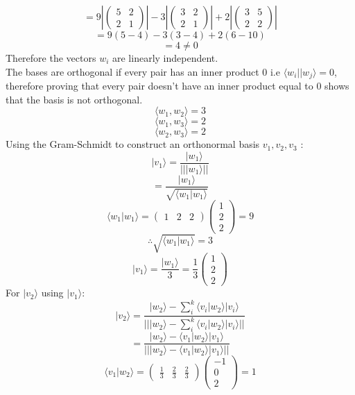 \documentclass[12pt]{article}
\newcommand{\ket}[1]{\vert{#1}\rangle}
\newcommand{\bra}[1]{\langle{#1}\vert}
\begin{document}
\begin{enumerate}
$$ = 9 |\left( \begin{array}{cc} 5 & 2 \\ 2 & 1 \end{array} \right) | - 3|\left( \begin{array}{cc} 3 & 2 \\ 2 & 1 \end{array} \right) | + 2|\left( \begin{array}{cc} 3 & 5 \\ 2 & 2 \end{array} \right) | $$
$$ = 9(5-4) -3(3-4)+2(6-10) $$
$$ = 4 \neq 0 $$
Therefore the vectors $w_i$ are linearly independent. 
\\
The bases are orthogonal if every pair has an inner product 0 i.e $\bra{w_i}\ket{w_j} = 0$, therefore proving that every pair doesn't have an inner product equal to 0 shows that the basis is not orthogonal.
$$ \langle w_1,w_2 \rangle = 3$$
$$ \langle w_1,w_3 \rangle = 2$$
$$ \langle w_2,w_3 \rangle = 2$$
Using the Gram-Schmidt to construct an orthonormal basis $v_1, v_2, v_3$ :
$$ \ket{v_1} = \frac{\ket{w_1}}{||\ket{w_1}||} $$
$$ = \frac{\ket{w_1}}{\sqrt{\langle w_1 | w_1 \rangle}} $$
$$ \langle w_1 | w_1 \rangle = \left( \begin{array}{ccc} 1 & 2 &2 \end{array} \right) \left( \begin{array}{ccc} 1 \\ 2 \\ 2\end{array} \right) = 9 $$
$$ \therefore \sqrt{\langle w_1 | w_1 \rangle} = 3 $$
$$ \ket{v_1} = \frac{\ket{w_1}}{3} = \frac{1}{3} \left( \begin{array}{ccc} 1 \\ 2 \\ 2\end{array} \right) $$
For $\ket{v_2} $ using $\ket{v_1}$: 
$$ \ket{v_2} = \frac{\ket{w_2} - \sum_i^k \langle v_i | w_2 \rangle \ket{v_i}}{||\ket{w_2} - \sum_i^k \langle v_i | w_2 \rangle \ket{v_i} ||} $$
$$ = \frac{\ket{w_2} - \langle v_1 | w_2 \rangle \ket{v_1}}{||\ket{w_2} - \langle v_1 | w_2 \rangle \ket{v_1} ||}$$
$$ \langle v_1 | w_2 \rangle = \left( \begin{array}{ccc} \frac{1}{3} & \frac{2}{3} &\frac{2}{3} \end{array}\right) \left( \begin{array}{ccc} -1 \\ 0 \\ 2\end{array} \right) =1 $$

\end{enumerate}
\end{document}
